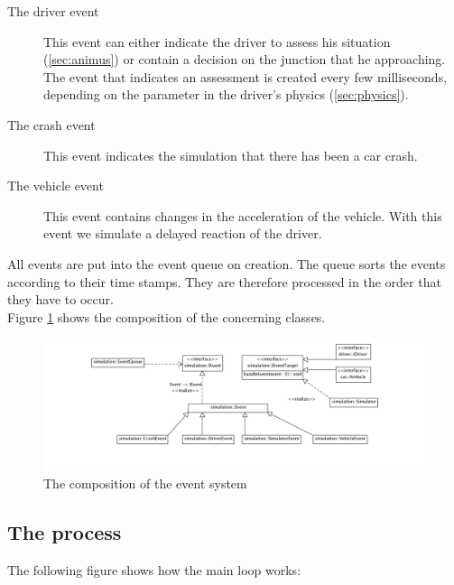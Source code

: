 \begin{description}
\item[The driver event] This event can either indicate the driver
to assess his situation (\ref{sec:animus}) or contain a decision on the 
junction that he approaching. The event that indicates an assessment
is created every few milliseconds, depending on the parameter in the driver's
physics (\ref{sec:physics}).
\item[The crash event]
This event indicates the simulation that there has been a car crash.
\item[The vehicle event]
This event contains changes in the acceleration of the vehicle. With this 
event we simulate a delayed reaction of the driver.
\end{description}

\noindent All events are put into the event queue on creation. The queue sorts the
events according to their time stamps. They are therefore processed in the
order that they have to occur. \\

\noindent Figure \ref{fig:eventSystem} shows the composition of the 
concerning classes. \\

\begin{figure}[H]
\begin{center}
\includegraphics[width=\textwidth]{images/eventsystem.png}
\end{center}
\caption{The composition of the event system}
\label{fig:eventSystem}
\end{figure}

\subsection{The process}
\label{sec:process}

The following figure shows how the main loop works:

